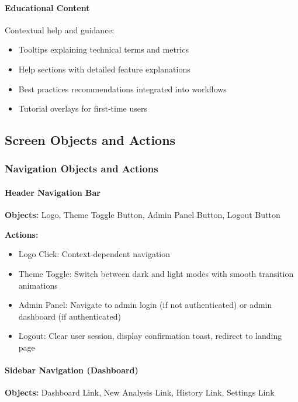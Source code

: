 \documentclass[12pt,a4paper]{article}
\begin{document}
    \paragraph{Educational Content}
    Contextual help and guidance:
    \begin{itemize}[leftmargin=0.5in]
        \item Tooltips explaining technical terms and metrics
        \item Help sections with detailed feature explanations
        \item Best practices recommendations integrated into workflows
        \item Tutorial overlays for first-time users
    \end{itemize}

    \subsection{Screen Objects and Actions}

    \subsubsection{Navigation Objects and Actions}

    \paragraph{Header Navigation Bar}
    \textbf{Objects:} Logo, Theme Toggle Button, Admin Panel Button, Logout Button

    \textbf{Actions:}
    \begin{itemize}[leftmargin=0.5in]
        \item Logo Click: Context-dependent navigation
        \item Theme Toggle: Switch between dark and light modes with smooth transition animations
        \item Admin Panel: Navigate to admin login (if not authenticated) or admin dashboard (if authenticated)
        \item Logout: Clear user session, display confirmation toast, redirect to landing page
    \end{itemize}

    \paragraph{Sidebar Navigation (Dashboard)}
    \textbf{Objects:} Dashboard Link, New Analysis Link, History Link, Settings Link
\end{document}
